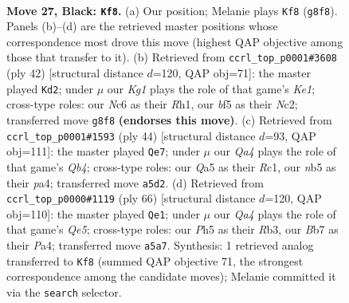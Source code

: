 \documentclass[11pt]{article}
\begin{document}
\clearpage

\begin{figure}[p]\centering
\begin{subfigure}{0.46\textwidth}\centering
\resizebox{\linewidth}{!}{%
\newchessgame
\chessboard[
  setfen={r5k1/Pb2rp2/1pn2n2/qN1p1BNp/P2P3P/R5P1/2Q2K2/7R b - - 0 27},
  showmover=false,
  pgfstyle=straightmove, color=movearrow, markmove={g8-f8}
]}
\caption{}
\end{subfigure}\hfill
\begin{subfigure}{0.46\textwidth}\centering
\resizebox{\linewidth}{!}{%
\newchessgame
\chessboard[
  setfen={1rb2rk1/5p1p/p2p1npQ/q1p5/2P1P1P1/2N2P2/P1N5/R3K2R w KQ - 3 22},
  showmover=false,
  pgfstyle=straightmove, color=movearrow, markmove={e1-d2}
]}
\caption{}
\end{subfigure}
\\[4pt]
\begin{subfigure}{0.46\textwidth}\centering
\resizebox{\linewidth}{!}{%
\newchessgame
\chessboard[
  setfen={r5k1/3n2pp/bq2pp2/1p6/pQnP2PB/3N4/4PP1P/R1R3K1 w - - 0 23},
  showmover=false,
  pgfstyle=straightmove, color=movearrow, markmove={b4-e7}
]}
\caption{}
\end{subfigure}\hfill
\begin{subfigure}{0.46\textwidth}\centering
\resizebox{\linewidth}{!}{%
\newchessgame
\chessboard[
  setfen={2br2k1/rp2qp2/2p1p1p1/P2nQ2p/P1BP4/1R3NPP/5P2/2R3K1 w - - 3 34},
  showmover=false,
  pgfstyle=straightmove, color=movearrow, markmove={e5-e1}
]}
\caption{}
\end{subfigure}
\caption{\textbf{Move 27, Black: \texttt{Kf8}.} (a) Our position; Melanie plays \texttt{Kf8} (\texttt{g8f8}). Panels (b)--(d) are the retrieved master positions whose correspondence most drove this move (highest QAP objective among those that transfer to it). (b) Retrieved from \texttt{ccrl\_top\_p0001\#3608} (ply 42) [structural distance $d$=120, QAP obj=71]: the master played \texttt{Kd2}; under $\mu$ our \emph{Kg1} plays the role of that game's \emph{Ke1}; cross-type roles: our \emph{N}c6 as their \emph{R}h1, our \emph{b}f5 as their \emph{N}c2; transferred move \texttt{g8f8} \textbf{(endorses this move)}. (c) Retrieved from \texttt{ccrl\_top\_p0001\#1593} (ply 44) [structural distance $d$=93, QAP obj=111]: the master played \texttt{Qe7}; under $\mu$ our \emph{Qa4} plays the role of that game's \emph{Qb4}; cross-type roles: our \emph{Q}a5 as their \emph{R}c1, our \emph{n}b5 as their \emph{p}a4; transferred move \texttt{a5d2}. (d) Retrieved from \texttt{ccrl\_top\_p0000\#1119} (ply 66) [structural distance $d$=120, QAP obj=110]: the master played \texttt{Qe1}; under $\mu$ our \emph{Qa4} plays the role of that game's \emph{Qe5}; cross-type roles: our \emph{P}h5 as their \emph{R}b3, our \emph{B}b7 as their \emph{P}a4; transferred move \texttt{a5a7}. Synthesis: 1 retrieved analog transferred to \texttt{Kf8} (summed QAP objective 71, the strongest correspondence among the candidate moves); Melanie committed it via the \texttt{search} selector.}
\label{fig:thought-m53}
\end{figure}
\end{document}
